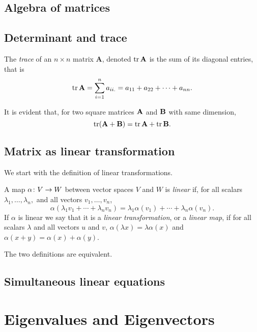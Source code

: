 \documentclass[main.tex]{subfiles}
\begin{document}
		\subsection{Algebra of matrices}
		
		\subsection{Determinant and trace}
			\begin{definition}
				The \textit{trace}  of an $n \times n$ matrix $\mathbf{A}$, denoted $\operatorname{tr} \mathbf{A}$ is the sum of its diagonal entries, that is
				\begin{equation*}
					\operatorname{tr} \mathbf{A} = \sum_{i = 1}^{n} a_{ii.} = a_{11} + a_{22} + \cdots + a_{nn}.
				\end{equation*}
			\end{definition}
			\begin{theorem}
				It is evident that, for two square matrices $\mathbf{A}$ and $\mathbf{B}$ with same dimension,
				\begin{equation*}
				\operatorname{tr}(\mathbf{A + B}) = \operatorname{tr}\mathbf{A} + \operatorname{tr}\mathbf{B}.
				\end{equation*}
			\end{theorem}
		
			
			
		\subsection{Matrix as linear transformation}
			We start with the definition of linear transformations.
			\begin{definition}
				A map $\alpha \colon V \rightarrow W$ between vector spaces $V$ and $W$ is \textit{linear} if, for all scalars $\lambda_1, \ldots, \lambda_n,$ and all vectors $v_1, \ldots, v_n$,
				\begin{equation*}
					\alpha\left(\lambda_1v_1 + \cdots + \lambda_n v_n\right) = \lambda_1\alpha(v_1) + \cdots + \lambda_n\alpha(v_n).
				\end{equation*}
			If $\alpha$ is linear we say that it is a \textit{linear transformation}, or a \textit{linear map}, if for all scalars $\lambda$ and all vectors $u$ and $v$, $\alpha(\lambda x) = \lambda\alpha(x)$ and $\alpha( x + y) = \alpha (x) + \alpha(y)$.
			\end{definition}
		The two definitions are equivalent.
		
		\subsection{Simultaneous linear equations}
		
		\section{Eigenvalues and Eigenvectors}
		
\end{document}
